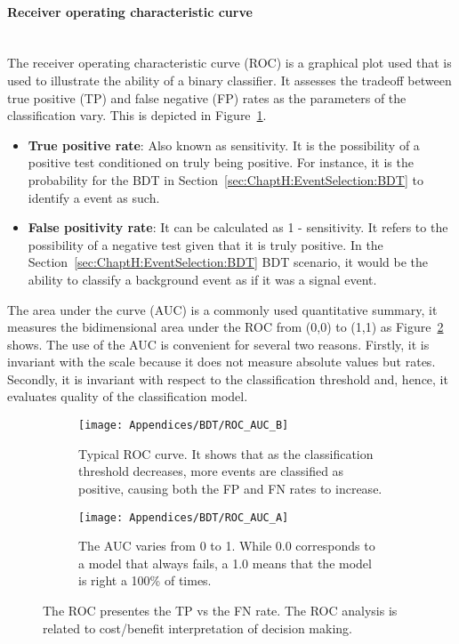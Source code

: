 \paragraph{Receiver operating characteristic curve}\mbox{}\\
The receiver operating characteristic curve (ROC) is a graphical plot used
that is used to illustrate the ability of a binary classifier. It assesses the 
tradeoff between true positive (TP) and false negative (FP) rates as the parameters of the classification vary.
This is depicted in Figure~\ref{fig:Appendix:BDT:ROC_AUC:ROC}. 
\begin{itemize}
	\item \textbf{True positive rate}: Also known as sensitivity. 
	It is the possibility of a positive test conditioned on truly being positive. For instance, it is the probability
	for the BDT in Section~\ref{sec:ChaptH:EventSelection:BDT} to identify a \tHq event as such. 
	\item \textbf{False positivity rate}: It can be calculated as 1 - sensitivity. 
	It refers to the possibility of a negative test given that it is truly positive. In the Section~\ref{sec:ChaptH:EventSelection:BDT}
	BDT scenario, it would be the ability to classify a background event as if it was a \tHq signal event.  
\end{itemize}

The area under the curve (AUC) is a commonly used quantitative summary, it measures the
bidimensional area under the ROC from (0,0) to (1,1) as Figure~\ref{fig:Appendix:BDT:ROC_AUC:AUC} shows.
The use of the AUC is convenient for several two reasons. Firstly, it is invariant with the scale because it does
not measure absolute values but rates. Secondly, it is invariant with respect to the classification threshold and,
hence, it evaluates quality of the classification model.

\begin{figure}[h]
\begin{subfigure}[h]{0.45\linewidth}
\texttt{[image: Appendices/BDT/ROC\_AUC\_B]}
\caption{Typical ROC curve. It shows that as the classification threshold decreases, more events are classified as positive, 
causing both the FP and FN rates to increase.}
\label{fig:Appendix:BDT:ROC_AUC:ROC}
\end{subfigure}
\hfill
\begin{subfigure}[h]{0.45\linewidth}
\texttt{[image: Appendices/BDT/ROC\_AUC\_A]}
\caption{The AUC varies from 0 to 1. While 0.0 corresponds to a model that always fails, a 1.0 
means that the model is right a 100\% of times.}
\label{fig:Appendix:BDT:ROC_AUC:AUC}
\end{subfigure}%
\caption{The ROC presentes the TP vs the FN rate. The ROC analysis is related
to cost/benefit interpretation of decision making. }
\label{fig:Appendix:BDT:ROC_AUC}
\end{figure}

